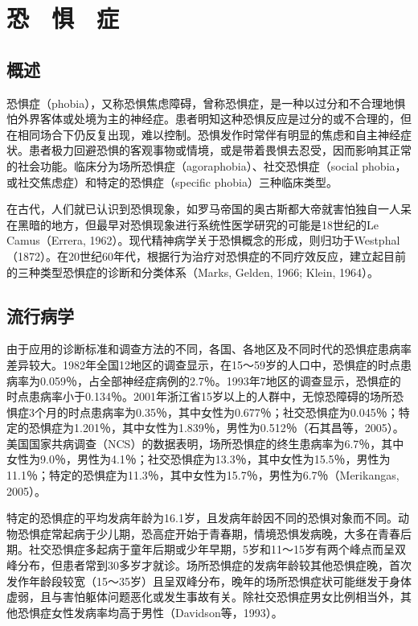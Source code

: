 \section{恐　惧　症}

\subsection{概述}

恐惧症（phobia），又称恐惧焦虑障碍，曾称恐惧症，是一种以过分和不合理地惧怕外界客体或处境为主的神经症。患者明知这种恐惧反应是过分的或不合理的，但在相同场合下仍反复出现，难以控制。恐惧发作时常伴有明显的焦虑和自主神经症状。患者极力回避恐惧的客观事物或情境，或是带着畏惧去忍受，因而影响其正常的社会功能。临床分为场所恐惧症（agoraphobia）、社交恐惧症（social
phobia，或社交焦虑症）和特定的恐惧症（specific phobia）三种临床类型。

在古代，人们就已认识到恐惧现象，如罗马帝国的奥古斯都大帝就害怕独自一人呆在黑暗的地方，但最早对恐惧现象进行系统性医学研究的可能是18世纪的Le
Camus（Errera,
1962）。现代精神病学关于恐惧概念的形成，则归功于Westphal（1872）。在20世纪60年代，根据行为治疗对恐惧症的不同疗效反应，建立起目前的三种类型恐惧症的诊断和分类体系（Marks,
Gelden, 1966; Klein, 1964）。

\subsection{流行病学}

由于应用的诊断标准和调查方法的不同，各国、各地区及不同时代的恐惧症患病率差异较大。1982年全国12地区的调查显示，在15～59岁的人口中，恐惧症的时点患病率为0.059％，占全部神经症病例的2.7％。1993年7地区的调查显示，恐惧症的时点患病率小于0.134％。2001年浙江省15岁以上的人群中，无惊恐障碍的场所恐惧症3个月的时点患病率为0.35％，其中女性为0.677％；社交恐惧症为0.045％；特定的恐惧症为1.201％，其中女性为1.839％，男性为0.512％（石其昌等，2005）。美国国家共病调查（NCS）的数据表明，场所恐惧症的终生患病率为6.7％，其中女性为9.0％，男性为4.1％；社交恐惧症为13.3％，其中女性为15.5％，男性为11.1％；特定的恐惧症为11.3％，其中女性为15.7％，男性为6.7％（Merikangas,
2005）。

特定的恐惧症的平均发病年龄为16.1岁，且发病年龄因不同的恐惧对象而不同。动物恐惧症常起病于少儿期，恐高症开始于青春期，情境恐惧发病晚，大多在青春后期。社交恐惧症多起病于童年后期或少年早期，5岁和11～15岁有两个峰点而呈双峰分布，但患者常到30多岁才就诊。场所恐惧症的发病年龄较其他恐惧症晚，首次发作年龄段较宽（15～35岁）且呈双峰分布，晚年的场所恐惧症状可能继发于身体虚弱，且与害怕躯体问题恶化或发生事故有关。除社交恐惧症男女比例相当外，其他恐惧症女性发病率均高于男性（Davidson等，1993）。

